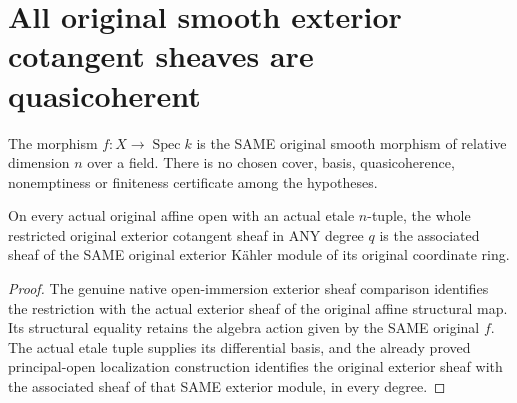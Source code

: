 \section{All original smooth exterior cotangent sheaves are quasicoherent}
\label{sec:smooth-exterior-quasicoherent}

The morphism $f:X\to\operatorname{Spec}k$ is the SAME original
smooth morphism of relative dimension $n$ over a field. There
is no chosen cover, basis, quasicoherence, nonemptiness or
finiteness certificate among the hypotheses.

\begin{lemma}
\label{lem:smooth-original-affine-exterior-quasicoherent}
\leanok
{}
On every actual original affine open with an actual etale
$n$-tuple, the whole restricted original exterior cotangent
sheaf in ANY degree $q$ is the associated sheaf of the SAME
original exterior K\"ahler module of its original coordinate ring.
\end{lemma}
\begin{proof}
The genuine native open-immersion exterior sheaf comparison
identifies the restriction with the actual exterior sheaf of
the original affine structural map. Its structural equality
retains the algebra action given by the SAME original $f$.
The actual etale tuple supplies its differential basis, and
the already proved principal-open localization construction
identifies the original exterior sheaf with the associated
sheaf of that SAME exterior module, in every degree.
\end{proof}

